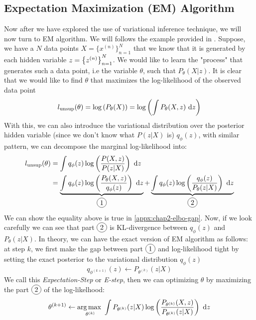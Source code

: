 \subsection{Expectation Maximization (EM) Algorithm}
\label{sec:chap2-em-algo}
Now after we have explored the use of variational inference technique, we will now turn to EM algorithm. We will follows the example provided in \cite{fellows2019virel}. Suppose, we have a $N$ data points $X = \{x^{(n)}\}^N_{n=1}$ that we know that it is generated by each hidden variable $z = \left\{ z^{(n)} \right\}^N_{n=1}$. We would like to learn the "process" that generates such a data point, i.e the variable $\theta$, such that $P_{\theta}(X | z)$. It is clear that we would like to find $\theta$ that maximizes the log-likelihood of the observed data point
\begin{equation}
    l_{\text{unsup}}(\theta) = \log \left( P_{\theta}(X) \right) = \log\left( \int P_{\theta}(X, z) \ \mathrm{d} z \right)
\end{equation}
With this, we can also introduce the variational distribution over the posterior hidden variable (since we don't know what $P(z | X)$ is) $q_{\phi}(z)$, with similar pattern, we can decompose the marginal log-likelihood into:
\begin{equation}
    \begin{aligned}
        l_{\text{unsup}}(\theta) &= \int q_{\phi}(z) \log \bracka{\frac{P(X, z)}{P(z | X)}} \dby z \\
        &= \underbrace{\int q_{\phi}(z) \log \bracka{\frac{P_{\theta}(X, z)}{q_{\phi}(z)}} \dby z}_{\circled{1}} + \underbrace{\int q_{\phi}(z) \log \bracka{\frac{q_{\phi}(z)}{P_{\theta}(z | X)}} \dby z}_{\circled{2}}
    \end{aligned}
\end{equation}
We can show the equality above is true in \ref{appx:chap2-elbo-gap}. Now, if we look carefully we can see that part $\circled{2}$ is KL-divergence between $q_{\phi}(z)$ and $P_{\theta}(z | X)$. In theory, we can have the exact version of EM algorithm as follows: at step $k$, we first make the gap between part $\circled{1}$ and log-likelihood tight by setting the exact posterior to the variational distribution $q_{\phi}(z)$
\begin{equation}
    q_{\phi^{(k+1)}}(z) \leftarrow P_{\theta^{(k)}}(z | X)
\end{equation}
We call this \textit{Expectation-Step} or \textit{E-step}, then we can optimizing $\theta$ by maximizing the part $\circled{2}$ of the log-likelhood:
\begin{equation}
    \theta^{(k+1)} \leftarrow \underset{\theta^{(k)}}{\arg\max \ }  \int P_{\theta^{(k)}}(z | X) \log \left( \frac{P_{\theta^{(k)}}(X, z)}{P_{\theta^{(k)}}(z | X)} \right) \ \mathrm{d} z 
\end{equation}
